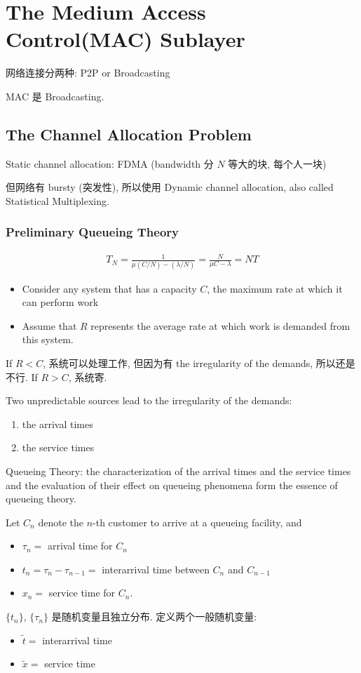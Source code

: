 \newpage
\section{The Medium Access Control(MAC) Sublayer}
网络连接分两种: P2P or Broadcasting

MAC 是 Broadcasting. 

\subsection{The Channel Allocation Problem}
Static channel allocation: FDMA (bandwidth 分 $N$ 等大的块, 每个人一块)

但网络有 bursty (突发性), 所以使用 Dynamic channel allocation, also called Statistical Multiplexing. 


\subsubsection{Preliminary Queueing Theory}
\begin{align*}
    T_N=\frac{1}{\mu (C/N)-(\lambda/N)}=\frac{N}{\mu C-\lambda}=NT
\end{align*}
\begin{itemize}
    \item Consider any system that has a capacity $C$, the maximum rate at which it can perform work
    \item Assume that $R$ represents the average rate at which work is demanded from this system.
\end{itemize}

If $R<C$, 系统可以处理工作, 但因为有 the irregularity of the demands, 所以还是不行. If $R>C$, 系统寄. 

Two unpredictable sources lead to the irregularity of the demands:
\begin{enumerate}
    \item the arrival times
    \item the service times
\end{enumerate}


Queueing Theory: the characterization of the arrival times and the service times and the evaluation of their effect on queueing phenomena form the essence of queueing theory.

Let $C_n$ denote the $n$-th customer to arrive at a queueing facility, and 
\begin{itemize}
    \item $\tau_n=$ arrival time for $C_n$
    \item $t_n=\tau_n-\tau_{n-1}=$ interarrival time between $C_n$ and $C_{n-1}$
    \item $x_n=$ service time for $C_n$. 
\end{itemize}
$\{ t_n\}$,  $\{ \tau_n \}$ 是随机变量且独立分布. 定义两个一般随机变量:
\begin{itemize}
    \item $\tilde{t}=$ interarrival time
    \item $\tilde{x}=$ service time
\end{itemize}

